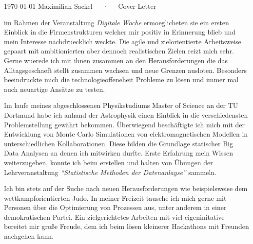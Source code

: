 \documentclass[11pt, a4paper]{Awesome-CV/awesome-cv}
\begin{document}
\makecvheader[R]

\makecvfooter
  {\today}
  {Maximilian Sackel~~~·~~~Cover Letter}
  {}

\makelettertitle

\begin{cvletter}
im Rahmen der Veranstaltung \textit{Digitale Woche} ermoeglicheten sie ein ersten Einblick
in die Firmenstrukturen welcher mir positiv in Erinnerung blieb
und mein Interesse nachdruecklich weckte.
Die agile und zielorientierte Arbeitsweise gepaart mit ambitionierten aber
dennoch realistischen Zielen reizt mich sehr.
Gerne wuerede ich mit ihnen zusammen an den Herausforderungen die das
Alltagsgeschaeft stellt zusammen wachsen und neue Grenzen ausloten.
Besonders beeindruckte mich die technologieoffeneheit Probleme zu lösen
und immer mal auch neuartige Ansätze zu testen.

Im laufe meines abgeschlossenen Physikstudiums Master of Science an der TU Dortmund
habe ich anhand der Astrophysik einen Einblick in die verschiedensten
Problemstellung gewährt bekommen.
Überwiegend beschäftigte ich mich mit der Entwicklung von Monte Carlo Simulationen
von elektromagnetischen Modellen in unterschiedlichen Kollaborationen.
Diese bilden die Grundlage statischer Big Data Analysen an denen ich mitwirken durfte.
Erste Erfahrung mein Wissen weiterzugeben,
konnte ich beim erstellen und halten von Übungen der Lehrveranstaltung
\textit{``Statistische Methoden der Datenanlayse''} sammeln.


Ich bin stets auf der Suche nach neuen Herausforderungen wie beispielsweise dem
wettkampforientierten Judo.
In meiner Freizeit tausche ich mich gerne mit Personen über die Optimierung von
Prozessen aus, unter anderem in einer demokratischen Partei.
Ein zielgerichtetes Arbeiten mit viel eigeninitative bereitet mir große Freude,
dem ich beim lösen kleinerer Hackathons mit Freunden nachgehen kann.


\end{cvletter}
\end{document}
